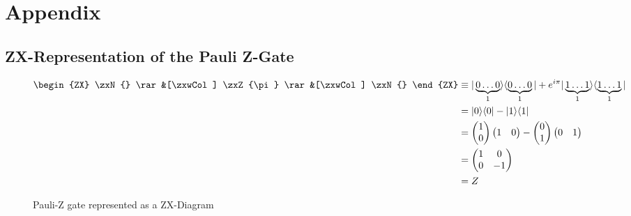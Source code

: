 \section{Appendix}

\subsection{ZX-Representation of the Pauli Z-Gate}
\label{appendix:pauli-z-gate-as-spider}

\begin{figure}[h]
    \begin{align*}
        \begin{ZX}
            \zxN{} \rar &[\zxwCol] \zxZ{\pi} \rar &[\zxwCol] \zxN{}
        \end{ZX}
         & \equiv |\underbrace{0\dots 0}_{1}\rangle \langle \underbrace{0\dots0}_{1}| + e^{i\pi}|\underbrace{1\dots1}_{1}\rangle \langle \underbrace{1\dots1}_{1}| \\
         & =
        |0\rangle \langle 0| - |1\rangle \langle 1|                                                                                                                \\
         & =
        \begin{pmatrix}
            1 \\
            0 \\
        \end{pmatrix}
        \begin{pmatrix}
            1 & 0 \\
        \end{pmatrix}
        - \begin{pmatrix}
              0 \\
              1 \\
          \end{pmatrix}
        \begin{pmatrix}
            0 & 1 \\
        \end{pmatrix}                                                                                                                                             \\
         & =
        \begin{pmatrix}
            1 & 0  \\
            0 & -1 \\
        \end{pmatrix}                                                                                                                                             \\
         & = Z
        \\
    \end{align*}
    \caption{Pauli-Z gate represented as a ZX-Diagram}
\end{figure}

